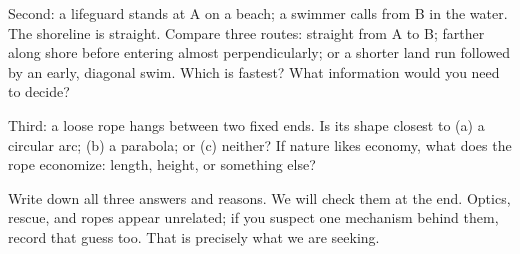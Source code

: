 Second: a lifeguard stands at A on a beach; a swimmer calls from B in the water. The shoreline is straight. Compare three routes: straight from A to B; farther along shore before entering almost perpendicularly; or a shorter land run followed by an early, diagonal swim. Which is fastest? What information would you need to decide?

Third: a loose rope hangs between two fixed ends. Is its shape closest to (a) a circular arc; (b) a parabola; or (c) neither? If nature likes economy, what does the rope economize: length, height, or something else?

Write down all three answers and reasons. We will check them at the end. Optics, rescue, and ropes appear unrelated; if you suspect one mechanism behind them, record that guess too. That is precisely what we are seeking.


